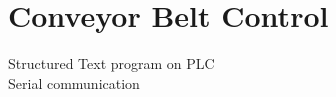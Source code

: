 \section{Conveyor Belt Control 
\label{sec:conveyor_belt_sec}}
Structured Text program on PLC \\
Serial communication 